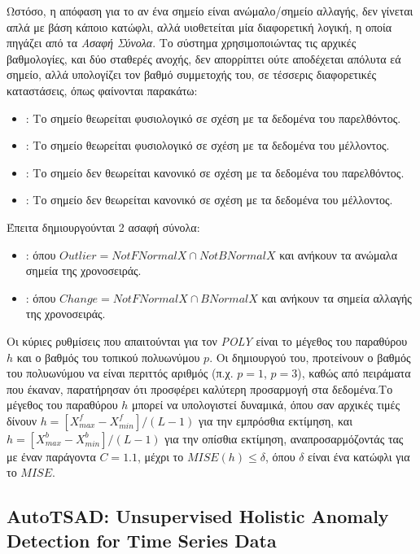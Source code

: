 Ωστόσο, η απόφαση για το αν ένα σημείο είναι ανώμαλο/σημείο αλλαγής, δεν γίνεται απλά με βάση κάποιο κατώφλι, αλλά υιοθετείται μία διαφορετική λογική, η οποία πηγάζει από τα \emph{Ασαφή Σύνολα}. Το σύστημα χρησιμοποιώντας τις αρχικές βαθμολογίες, και δύο σταθερές ανοχής, δεν απορρίπτει ούτε αποδέχεται απόλυτα εά σημείο, αλλά υπολογίζει τον βαθμό συμμετοχής του, σε τέσσερις διαφορετικές καταστάσεις, όπως φαίνονται παρακάτω:
\begin{itemize}
    \item {}: Το σημείο θεωρείται φυσιολογικό σε σχέση με τα δεδομένα του παρελθόντος.
    \item {}: Το σημείο θεωρείται φυσιολογικό σε σχέση με τα δεδομένα του μέλλοντος.
    \item {}: Το σημείο δεν θεωρείται κανονικό σε σχέση με τα δεδομένα του παρελθόντος.
    \item {}: Το σημείο δεν θεωρείται κανονικό σε σχέση με τα δεδομένα του μέλλοντος.
\end{itemize}

Έπειτα δημιουργούνται 2 ασαφή σύνολα:
\begin{itemize}
    \item {}: όπου $Outlier = NotFNormalX \cap NotBNormalX$ και ανήκουν τα ανώμαλα σημεία της χρονοσειράς.
    \item {}: όπου $Change = NotFNormalX \cap BNormalX$ και ανήκουν τα σημεία αλλαγής της χρονοσειράς.
\end{itemize}

Οι κύριες ρυθμίσεις που απαιτούνται για τον \emph{POLY} είναι το μέγεθος του παραθύρου $h$ και ο βαθμός του τοπικού πολυωνύμου $p$. Οι δημιουργού του, προτείνουν ο βαθμός του πολυωνύμου να είναι περιττός αριθμός (π.χ. $p=1$, $p=3$), καθώς από πειράματα που έκαναν, παρατήρησαν ότι προσφέρει καλύτερη προσαρμογή στα δεδομένα.Το μέγεθος του παραθύρου $h$ μπορεί να υπολογιστεί δυναμικά, όπου σαν αρχικές τιμές δίνουν $h=[X^f_{max} - X^f_{min}]/(L-1)$ για την εμπρόσθια εκτίμηση, και $h=[X^b_{max} - X^b_{min}]/(L-1)$ για την οπίσθια εκτίμηση, αναπροσαρμόζοντάς τας με έναν παράγοντα $C=1.1$, μέχρι το $MISE(h)\leq\delta$, όπου $\delta$ είναι ένα κατώφλι για το $MISE$.

\subsection{AutoTSAD: Unsupervised Holistic Anomaly Detection for Time Series Data}

